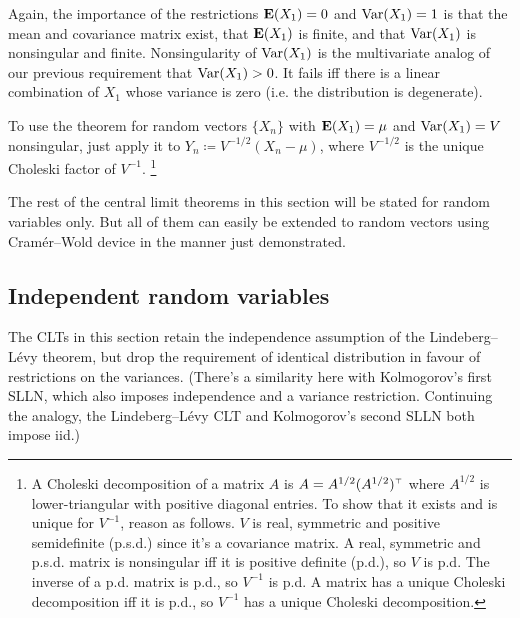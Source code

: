 \documentclass[11pt,letterpaper,reqno,oneside]{article}
\begin{document}
\begin{remark}
	Again, the importance of the restrictions $\mathbf{E}(X_1)=0$ and $\mathrm{Var}(X_1)=1$ is that the mean and covariance matrix exist, that $\mathbf{E}(X_1)$ is finite, and that $\mathrm{Var}(X_1)$ is nonsingular and finite. Nonsingularity of $\mathrm{Var}(X_1)$ is the multivariate analog of our previous requirement that $\mathrm{Var}(X_1)>0$. It fails iff there is a linear combination of $X_1$ whose variance is zero (i.e. the distribution is degenerate).

	To use the theorem for random vectors $\{X_n\}$ with $\mathbf{E}(X_1)=\mu$ and $\mathrm{Var}(X_1)=V$ nonsingular, just apply it to $Y_n \coloneqq V^{-1/2} ( X_n - \mu )$, where $V^{-1/2}$ is the unique Choleski factor of $V^{-1}$.%
		\footnote{A Choleski decomposition of a matrix $A$ is $A = A^{1/2} (A^{1/2})^{\scriptscriptstyle \top}$ where $A^{1/2}$ is lower-triangular with positive diagonal entries. To show that it exists and is unique for $V^{-1}$, reason as follows. $V$ is real, symmetric and positive semidefinite (p.s.d.) since it's a covariance matrix. A real, symmetric and p.s.d. matrix is nonsingular iff it is positive definite (p.d.), so $V$ is p.d. The inverse of a p.d. matrix is p.d., so $V^{-1}$ is p.d. A matrix has a unique Choleski decomposition iff it is p.d., so $V^{-1}$ has a unique Choleski decomposition.}
\end{remark}

The rest of the central limit theorems in this section will be stated for random variables only. But all of them can easily be extended to random vectors using Cramér--Wold device in the manner just demonstrated.



\subsection{Independent random variables}
\label{sec:CLTs:independent}

The CLTs in this section retain the independence assumption of the Lindeberg--Lévy theorem, but drop the requirement of identical distribution in favour of restrictions on the variances. (There's a similarity here with Kolmogorov's first SLLN, which also imposes independence and a variance restriction. Continuing the analogy, the Lindeberg--Lévy CLT and Kolmogorov's second SLLN both impose iid.)
\end{document}
